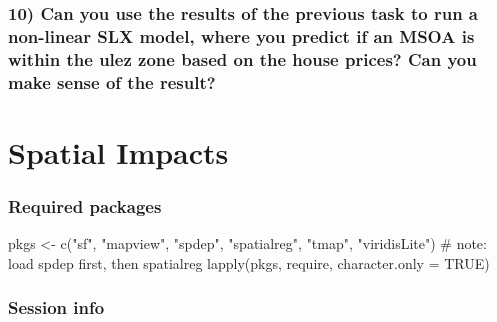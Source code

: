 \documentclass[
  letterpaper,
  DIV=11,
  numbers=noendperiod]{scrreprt}
\newenvironment{Shaded}{\begin{snugshade}}{\end{snugshade}}
\newcommand{\AttributeTok}[1]{\textcolor[rgb]{0.40,0.45,0.13}{#1}}
\newcommand{\CommentTok}[1]{\textcolor[rgb]{0.37,0.37,0.37}{#1}}
\newcommand{\ConstantTok}[1]{\textcolor[rgb]{0.56,0.35,0.01}{#1}}
\newcommand{\FunctionTok}[1]{\textcolor[rgb]{0.28,0.35,0.67}{#1}}
\newcommand{\NormalTok}[1]{\textcolor[rgb]{0.00,0.23,0.31}{#1}}
\newcommand{\OtherTok}[1]{\textcolor[rgb]{0.00,0.23,0.31}{#1}}
\newcommand{\StringTok}[1]{\textcolor[rgb]{0.13,0.47,0.30}{#1}}
\begin{document}
\hypertarget{can-you-use-the-results-of-the-previous-task-to-run-a-non-linear-slx-model-where-you-predict-if-an-msoa-is-within-the-ulez-zone-based-on-the-house-prices-can-you-make-sense-of-the-result}{%
\subsection{10) Can you use the results of the previous task to run a
non-linear SLX model, where you predict if an MSOA is within the ulez
zone based on the house prices? Can you make sense of the
result?}\label{can-you-use-the-results-of-the-previous-task-to-run-a-non-linear-slx-model-where-you-predict-if-an-msoa-is-within-the-ulez-zone-based-on-the-house-prices-can-you-make-sense-of-the-result}}


\hypertarget{spatial-impacts}{%
\chapter{Spatial Impacts}\label{spatial-impacts}}

\newcommand{\Exp}{\mathrm{E}}
\newcommand\given[1][]{\:#1\vert\:}
\newcommand{\Cov}{\mathrm{Cov}}
\newcommand{\Var}{\mathrm{Var}}
\newcommand{\rank}{\mathrm{rank}}
\newcommand{\bm}[1]{\boldsymbol{\mathbf{#1}}}

\hypertarget{required-packages-8}{%
\subsection*{Required packages}\label{required-packages-8}}

\begin{Shaded}
\begin{Highlighting}[]
\NormalTok{pkgs }\OtherTok{\textless{}{-}} \FunctionTok{c}\NormalTok{(}\StringTok{"sf"}\NormalTok{, }\StringTok{"mapview"}\NormalTok{, }\StringTok{"spdep"}\NormalTok{, }\StringTok{"spatialreg"}\NormalTok{, }\StringTok{"tmap"}\NormalTok{, }\StringTok{"viridisLite"}\NormalTok{) }\CommentTok{\# note: load spdep first, then spatialreg}
\FunctionTok{lapply}\NormalTok{(pkgs, require, }\AttributeTok{character.only =} \ConstantTok{TRUE}\NormalTok{)}
\end{Highlighting}
\end{Shaded}

\hypertarget{session-info-8}{%
\subsection*{Session info}\label{session-info-8}}
\end{document}

